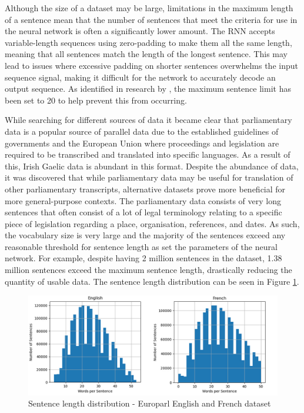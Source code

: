 Although the size of a dataset may be large, limitations in the maximum length of a sentence mean that the number of sentences that meet the criteria for use in the neural network is often a significantly lower amount. The RNN accepts variable-length sequences using zero-padding to make them all the same length, meaning that all sentences match the length of the longest sentence. This may lead to issues where excessive padding on shorter sentences overwhelms the input sequence signal, making it difficult for the network to accurately decode an output sequence. As identified in research by \cite{cho_properties_2014}, the maximum sentence limit has been set to 20 to help prevent this from occurring.

While searching for different sources of data it became clear that parliamentary data is a popular source of parallel data due to the established guidelines of governments and the European Union where proceedings and legislation are required to be transcribed and translated into specific languages. As a result of this, Irish Gaelic data is abundant in this format. Despite the abundance of data, it was discovered that while parliamentary data may be useful for translation of other parliamentary transcripts, alternative datasets prove more beneficial for more general-purpose contexts. The parliamentary data consists of very long sentences that often consist of a lot of legal terminology relating to a specific piece of legislation regarding a place, organisation, references, and dates. 
As such, the vocabulary size is very large and the majority of the sentences exceed any reasonable threshold for sentence length as set the parameters of the neural network. For example, despite having 2 million sentences in the \cite{french_corpus_2005} dataset, 1.38 million sentences exceed the maximum sentence length, drastically reducing the quantity of usable data. The sentence length distribution can be seen in Figure \ref{fig:sentence_length-french_legal}.

\begin{figure}[ht!]
\centering
\includegraphics[width=1\textwidth]{media/methodology/s_length-1-en_fr.jpg}
\captionsetup{justification=centering}
\caption[Europarl dataset sentence length distribution]{Sentence length distribution - Europarl English and French dataset} %
\label{fig:sentence_length-french_legal}
\end{figure}

